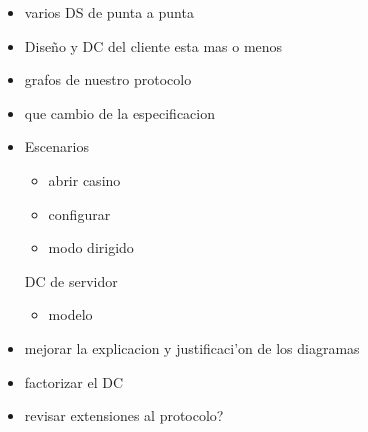 \documentclass[spanish, a4paper, 10pt, titlepage]{article}
\begin{document}
\begin{itemize}
    \item varios DS de punta a punta
    \item Diseño y DC del cliente 			esta mas o menos
    \item grafos de nuestro protocolo
    \item  que cambio de la especificacion
    \item  Escenarios  
   \begin{itemize}
        \item       abrir casino
        \item          configurar
        \item        modo dirigido
    \end{itemize}
DC de servidor
\begin{itemize}
 \item modelo
\end{itemize}
          
        
          
    
    \item mejorar la explicacion y justificaci'on de los diagramas
    \item factorizar el DC
    \item revisar extensiones al protocolo?


\end{itemize}
\end{document}
